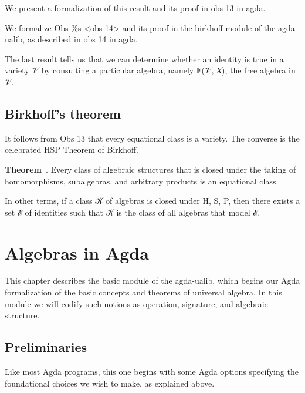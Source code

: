 \documentclass[sigplan,screen]{acmart}
\begin{document}

We present a formalization of this result and its proof in obs 13 in agda.

We formalize Obs \%s \textless{}obs 14\textgreater{} and its proof in the \href{}{birkhoff module} of the \href{}{agda-ualib}, as described in obs 14 in agda.

The last result tells us that we can determine whether an identity is true in a variety 𝒱 by consulting a particular algebra, namely 𝔽(𝒱, 𝑋), the free algebra in 𝒱.

\subsection{Birkhoff's theorem}\label{birkhoffs-theorem}
It follows from Obs 13 that every equational class is a variety. The converse is the celebrated HSP Theorem of Birkhoff.

\noindent \textbf{Theorem}~\cite{Birkhoff:1935}. Every class of algebraic structures that is closed under the taking of homomorphisms, subalgebras, and arbitrary products is an equational class.

In other terms, if a class 𝒦 of algebras is closed under H, S, P, then there exists a set ℰ of identities such that 𝒦 is the class of all algebras that model ℰ.


\section{Algebras in Agda}
This chapter describes the basic module of the agda-ualib, which begins our Agda formalization of the basic concepts and theorems of universal algebra. In this module we will codify such notions as operation, signature, and algebraic structure.

\subsection{Preliminaries}
Like most Agda programs, this one begins with some Agda options specifying the foundational choices we wish to make, as explained above.
\end{document}
